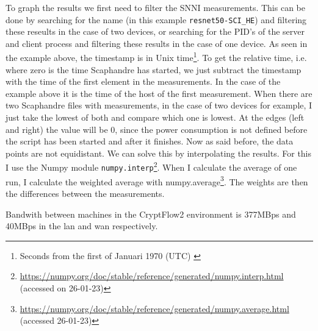 \documentclass[../thesis.tex]{subfiles}
\begin{document}
To graph the results we first need to filter the SNNI measurements. This can be done by searching for the name (in this example \verb|resnet50-SCI_HE|) and filtering these reseults in the case of two devices, or searching for the PID's of the server and client process and filtering these results in the case of one device. As seen in the example above, the timestamp is in Unix time\footnote{Seconds from the first of Januari 1970 (UTC) \url{}}. To get the relative time, i.e. where zero is the time Scaphandre has started, we just subtract the timestamp with the time of the first element in the measurements. In the case of the example above it is the time of the host of the first measurement. When there are two Scaphandre files with measurements, in the case of two devices for example, I just take the lowest of both and compare which one is lowest. At the edges (left and right) the value will be 0, since the power consumption is not defined before the script has been started and after it finishes. Now as said before, the data points are not equidistant. We can solve this by interpolating the results. For this I use the Numpy module \verb|numpy.interp|\footnote{\url{https://numpy.org/doc/stable/reference/generated/numpy.interp.html} (accessed on 26-01-23)}. When I calculate the average of one run, I calculate the weighted average with numpy.average\footnote{\url{https://numpy.org/doc/stable/reference/generated/numpy.average.html} (accessed 26-01-23)}. The weights are then the differences between the measurements. 

\color{red}Bandwith between machines in the CryptFlow2 environment is 377MBps and 40MBps in the lan and wan respectively. \color{black}
\end{document}
